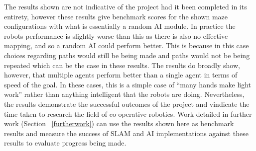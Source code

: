 The results shown are not indicative of the project had it been completed in its 
entirety, however these results give benchmark scores for the shown maze 
configurations with what is essentially a random AI module. In practice 
the robots performance is slightly worse than this as there is also no 
effective mapping, 
and so a random AI could perform better. This is because in this case choices 
regarding paths would still be being made and paths would not be being repeated 
which can be the case in these results. The results do broadly show, however, 
that multiple agents perform better than a single agent in terms of speed of 
the goal. In these cases, this is a simple case of ``many hands make light 
work'' rather than anything intelligent that the robots are doing. 
Nevertheless, the results demonstrate the successful outcomes of the project 
and vindicate the time taken to research the field of co-operative robotics. 
Work detailed in further work (Section~
\ref{furtherwork}) can use the results shown here as benchmark results and 
measure the success of SLAM and AI implementations against these results to 
evaluate progress being made. 
